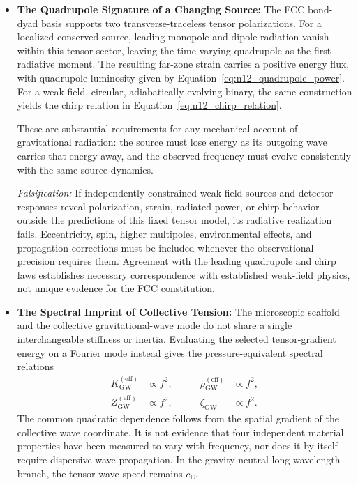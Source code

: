 \begin{itemize}

\item \textbf{The Quadrupole Signature of a Changing Source:}
The FCC bond-dyad basis supports two transverse-traceless tensor polarizations.
For a localized conserved source, leading monopole and dipole radiation vanish
within this tensor sector, leaving the time-varying quadrupole as the first
radiative moment. The resulting far-zone strain carries a positive energy flux,
with quadrupole luminosity given by
Equation~\eqref{eq:n12_quadrupole_power}. For a weak-field, circular,
adiabatically evolving binary, the same construction yields the chirp relation
in Equation~\eqref{eq:n12_chirp_relation}.

These are substantial requirements for any mechanical account of gravitational
radiation: the source must lose energy as its outgoing wave carries that energy
away, and the observed frequency must evolve consistently with the same
source dynamics.

\textit{Falsification:} If independently constrained weak-field sources and
detector responses reveal polarization, strain, radiated power, or chirp behavior
outside the predictions of this fixed tensor model, its radiative realization
fails. Eccentricity, spin, higher multipoles, environmental effects, and
propagation corrections must be included whenever the observational precision
requires them. Agreement with the leading quadrupole and chirp laws establishes
necessary correspondence with established weak-field physics, not unique
evidence for the FCC constitution.

\item \textbf{The Spectral Imprint of Collective Tension:}
The microscopic scaffold and the collective gravitational-wave mode do not
share a single interchangeable stiffness or inertia. Evaluating the selected
tensor-gradient energy on a Fourier mode instead gives the pressure-equivalent
spectral relations
\begin{equation}
\begin{aligned}
K_{\mathrm{GW}}^{(\mathrm{eff})} &\propto f^{2},
&\qquad \rho_{\mathrm{GW}}^{(\mathrm{eff})} &\propto f^{2},\\
Z_{\mathrm{GW}}^{(\mathrm{eff})} &\propto f^{2},
&\qquad \zeta_{\mathrm{GW}} &\propto f^{2}.
\end{aligned}
\end{equation}
The common quadratic dependence follows from the spatial gradient of the
collective wave coordinate. It is not evidence that four independent material
properties have been measured to vary with frequency, nor does it by itself
require dispersive wave propagation. In the gravity-neutral long-wavelength
branch, the tensor-wave speed remains $c_{\mathrm E}$.


\end{itemize}
